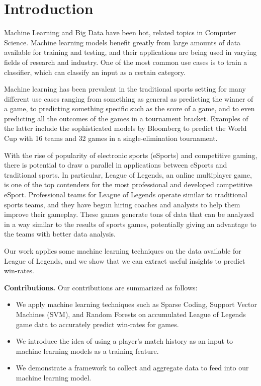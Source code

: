 \section{Introduction}

Machine Learning and Big Data have been hot, related topics in Computer Science.
Machine learning models benefit greatly from large amounts of data 
available for training and testing, and their applications are being used in varying fields 
of research and industry.  One of the most common use cases is to train a classifier, which 
can classify an input as a certain category.

Machine learning has been prevalent in the traditional sports setting for many different use 
cases ranging from something as general as predicting the winner of a game, to predicting something 
specific such as the score of a game, and to even predicting all the outcomes of the games in a 
tournament bracket.  Examples of the latter include the sophisticated models by Bloomberg to predict 
the World Cup with 16 teams and 32 games in a single-elimination tournament.  

With the rise of popularity of electronic sports (eSports) and competitive gaming, 
there is potential to draw a parallel in applications between eSports and traditional sports.  
In particular, League of Legends, an online multiplayer game, is one of the top contenders for 
the most professional and developed competitive eSport.  Professional teams for League of Legends 
operate similar to traditional sports teams, and they have begun hiring coaches and analysts to 
help them improve their gameplay.
These games generate tons of data that can be analyzed in a way 
similar to the results of sports games, potentially giving an advantage to the teams 
with better data analysis. 

Our work applies some 
machine learning techniques on the data available for League of Legends, and we show that
we can extract useful insights to predict win-rates.

\textbf{ Contributions.} Our contributions are summarized as follows:
\begin{itemize}
\item We apply machine learning techniques such as Sparse Coding, Support Vector Machines (SVM), 
and Random Forests on accumulated League of Legends 
game data to accurately predict win-rates for games. 
\item We introduce the idea of using a player's match history as an input to machine learning 
models as a training feature.
\item We demonstrate a framework to collect and aggregate data to feed into our machine learning model.
\end{itemize} 
